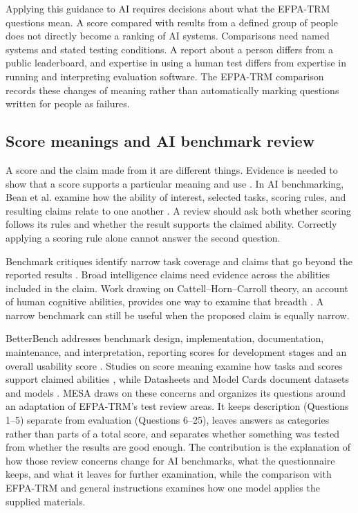 \documentclass[10pt,conference]{IEEEtran}
\begin{document}
Applying this guidance to AI requires decisions about what the EFPA-TRM questions mean. A score compared with results from a defined group of people does not directly become a ranking of AI systems. Comparisons need named systems and stated testing conditions. A report about a person differs from a public leaderboard, and expertise in using a human test differs from expertise in running and interpreting evaluation software. The EFPA-TRM comparison records these changes of meaning rather than automatically marking questions written for people as failures.

\subsection{Score meanings and AI benchmark review}
A score and the claim made from it are different things. Evidence is needed to show that a score supports a particular meaning and use \cite{kane_validation,aera_apa_ncme_standards_2014}. In AI benchmarking, Bean et al. examine how the ability of interest, selected tasks, scoring rules, and resulting claims relate to one another \cite{bean_measuring_what_matters}. A review should ask both whether scoring follows its rules and whether the result supports the claimed ability. Correctly applying a scoring rule alone cannot answer the second question.

Benchmark critiques identify narrow task coverage and claims that go beyond the reported results \cite{line_goes_up,alonso_church_sigir}. Broad intelligence claims need evidence across the abilities included in the claim. Work drawing on Cattell--Horn--Carroll theory, an account of human cognitive abilities, provides one way to examine that breadth \cite{hendrycks_definition_agi}. A narrow benchmark can still be useful when the proposed claim is equally narrow.

BetterBench addresses benchmark design, implementation, documentation, maintenance, and interpretation, reporting scores for development stages and an overall usability score \cite{reuel_betterbench}. Studies on score meaning examine how tasks and scores support claimed abilities \cite{bean_measuring_what_matters,jo_wilson_what_does_your_benchmark_measure}, while Datasheets and Model Cards document datasets and models \cite{gebru_datasheets_2021,mitchell_model_cards_2019}. MESA draws on these concerns and organizes its questions around an adaptation of EFPA-TRM's test review areas. It keeps description (Questions 1--5) separate from evaluation (Questions 6--25), leaves answers as categories rather than parts of a total score, and separates whether something was tested from whether the results are good enough. The contribution is the explanation of how those review concerns change for AI benchmarks, what the questionnaire keeps, and what it leaves for further examination, while the comparison with EFPA-TRM and general instructions examines how one model applies the supplied materials.
\end{document}
